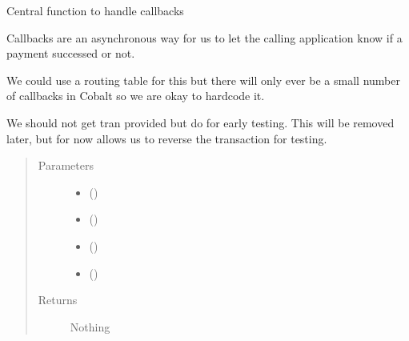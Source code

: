 \documentclass[letterpaper,10pt,english]{sphinxmanual}
\begin{document}
\begin{fulllineitems}
\label{\detokenize{payments:payments.core.callback_router}}
Central function to handle callbacks

Callbacks are an asynchronous way for us to let the calling application
know if a payment successed or not.

We could use a routing table for this but there will only ever be a small
number of callbacks in Cobalt so we are okay to hardcode it.

We should not get tran provided but do for early testing. This will be
removed later, but for now allows us to reverse the transaction for testing.
\begin{quote}\begin{description}
\item[{Parameters}] \leavevmode\begin{itemize}
\item {} 
 () \textendash{} 

\item {} 
 () \textendash{} 

\item {} 
 () \textendash{} 

\item {} 
 () \textendash{} 

\end{itemize}

\item[{Returns}] \leavevmode
Nothing

\end{description}\end{quote}

\end{fulllineitems}
\end{document}
